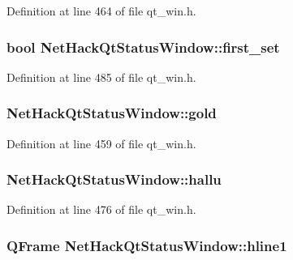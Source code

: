 Definition at line 464 of file qt\+\_\+win.\+h.

\hypertarget{classNetHackQtStatusWindow_a429ac66dd186b2c31df516814aee55f0}{
\subsubsection[{first\+\_\+set}]{\setlength{\rightskip}{0pt plus 5cm}bool Net\+Hack\+Qt\+Status\+Window\+::first\+\_\+set\hspace{0.3cm}{\ttfamily [private]}}}\label{classNetHackQtStatusWindow_a429ac66dd186b2c31df516814aee55f0}


Definition at line 485 of file qt\+\_\+win.\+h.

\hypertarget{classNetHackQtStatusWindow_a1037f6d2a608fc0bb7d54a4158dcf8e4}{
\subsubsection[{gold}]{ Net\+Hack\+Qt\+Status\+Window\+::gold\hspace{0.3cm}{\ttfamily [private]}}}\label{classNetHackQtStatusWindow_a1037f6d2a608fc0bb7d54a4158dcf8e4}


Definition at line 459 of file qt\+\_\+win.\+h.

\hypertarget{classNetHackQtStatusWindow_a687de31b31a66b9aca0e5ead303e899d}{
\subsubsection[{hallu}]{ Net\+Hack\+Qt\+Status\+Window\+::hallu\hspace{0.3cm}{\ttfamily [private]}}}\label{classNetHackQtStatusWindow_a687de31b31a66b9aca0e5ead303e899d}


Definition at line 476 of file qt\+\_\+win.\+h.

\hypertarget{classNetHackQtStatusWindow_a993bb3124d4a7599eb38602bd439d372}{
\subsubsection[{hline1}]{\setlength{\rightskip}{0pt plus 5cm}Q\+Frame Net\+Hack\+Qt\+Status\+Window\+::hline1\hspace{0.3cm}{\ttfamily [private]}}}\label{classNetHackQtStatusWindow_a993bb3124d4a7599eb38602bd439d372}


